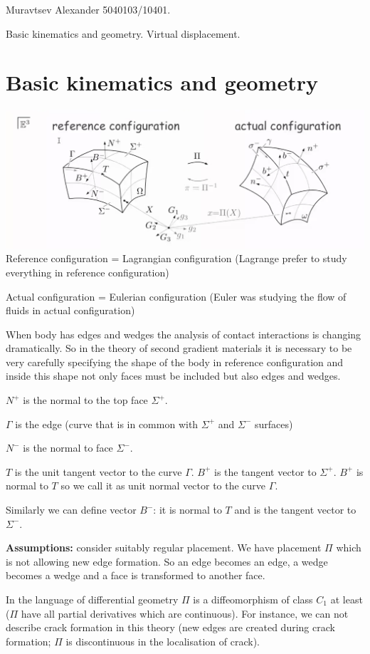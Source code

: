 \documentclass[a4paper,12pt]{article}
\begin{document}
Muravtsev Alexander 5040103/10401.

Basic kinematics and geometry. Virtual displacement.
\section{Basic kinematics and geometry}
\includegraphics[width=\textwidth]{ReferenceActualConfigurations}
Reference configuration = Lagrangian configuration (Lagrange prefer to study everything in reference configuration)

Actual configuration = Eulerian configuration (Euler was studying the flow of fluids in actual configuration)

When body has edges and wedges the analysis of contact interactions is changing dramatically. So in the theory of second gradient materials it is necessary to be very carefully specifying the shape of the body in reference configuration and inside this shape not only faces must be included but also edges and wedges.

$N^+$ is the normal to the top face $\Sigma^+$.

$\Gamma$ is the edge (curve that is in common with $\Sigma^+$ and $\Sigma^-$ surfaces)

$N^-$ is the normal to face $\Sigma^-$.

$T$ is the unit tangent vector to the curve $\Gamma$. $B^+$ is the tangent vector to $\Sigma^+$. $B^+$ is normal to $T$ so we call it as unit normal vector to the curve $\Gamma$. 

Similarly we can define vector $B^-$: it is normal to $T$ and is the tangent vector to $\Sigma^-$.

\textbf{Assumptions:} consider suitably regular placement. We have placement $\Pi$ which is not allowing new edge formation. So an edge becomes an edge, a wedge becomes a wedge and a face is transformed to another face.

In the language of differential geometry $\Pi$ is a diffeomorphism of class $C_1$ at least ($\Pi$ have all partial derivatives which are continuous). For instance, we can not describe crack formation in this theory (new edges are created during crack formation; $\Pi$ is discontinuous in the localisation of crack).
\end{document}

